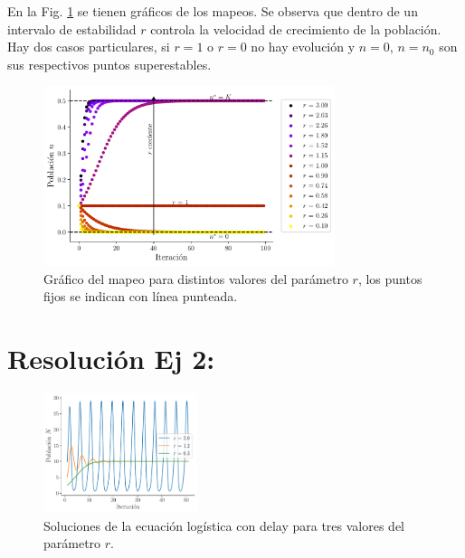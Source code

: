\documentclass[twocolumn,aps,prl]{revtex4-1}
\begin{document}
En la Fig. \ref{fig:scripts/ex1} se tienen gráficos de los mapeos. Se observa que dentro de un intervalo de estabilidad $r$ controla la velocidad de crecimiento de la población. Hay dos casos particulares, si $r=1$ o $r=0$ no hay evolución y $n=0$, $n=n_0$ son sus respectivos puntos superestables. 


\begin{figure}[ht!]  
    \centering
        \centering 
        \includegraphics[width = 0.76\textwidth]{scripts/ex1.pdf}
        \caption{Gráfico del mapeo para distintos valores del parámetro $r$, los puntos fijos se indican con línea punteada.}
        \label{fig:scripts/ex1}
\end{figure}

% 

\section{Resolución Ej 2:}

\begin{figure}[ht!]
    \centering
        \centering
        \includegraphics[width = 0.4\textwidth]{scripts/ex2-cosa.pdf}
        \caption{Soluciones de la ecuación logística con delay para tres valores del parámetro $r$.}
        \label{fig:scripts/ex2-cosa}
\end{figure}
\end{document}
